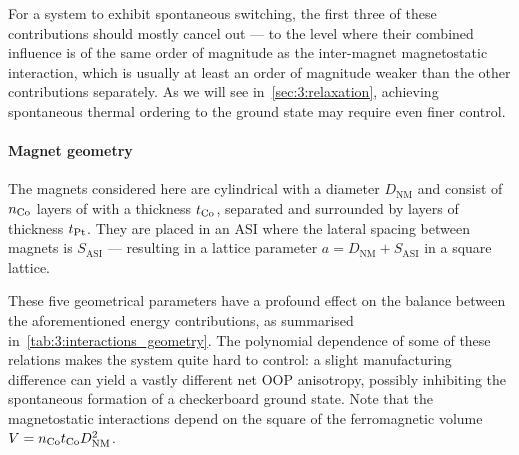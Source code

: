 For a system to exhibit spontaneous switching, the first three of these contributions should mostly cancel out --- to the level where their combined influence is of the same order of magnitude as the inter-magnet magnetostatic interaction, which is usually at least an order of magnitude weaker than the other contributions separately.
As we will see in~\cref{sec:3:relaxation}, achieving spontaneous thermal ordering to the ground state may require even finer control.

\paragraph{Magnet geometry}
\label{sec:3:OOP_geometry}

The magnets considered here are cylindrical with a diameter $D_\mathrm{NM}$ and consist of $n_{\ce{Co}}$ layers of  with a thickness $t_{\ce{Co}}$, separated and surrounded by  layers of thickness $t_{\ce{Pt}}$.
They are placed in an ASI where the lateral spacing between magnets is $S_\mathrm{ASI}$ --- resulting in a lattice parameter $a=D_\mathrm{NM}+S_\mathrm{ASI}$ in a square lattice. \par
These five geometrical parameters have a profound effect on the balance between the aforementioned energy contributions, as summarised in~\cref{tab:3:interactions_geometry}.
The polynomial dependence of some of these relations makes the system quite hard to control: a slight manufacturing difference can yield a vastly different net OOP anisotropy, possibly inhibiting the spontaneous formation of a checkerboard ground state.
Note that the magnetostatic interactions depend on the square of the ferromagnetic volume $V=n_{\ce{Co}} t_{\ce{Co}} D_\mathrm{NM}^2$.

